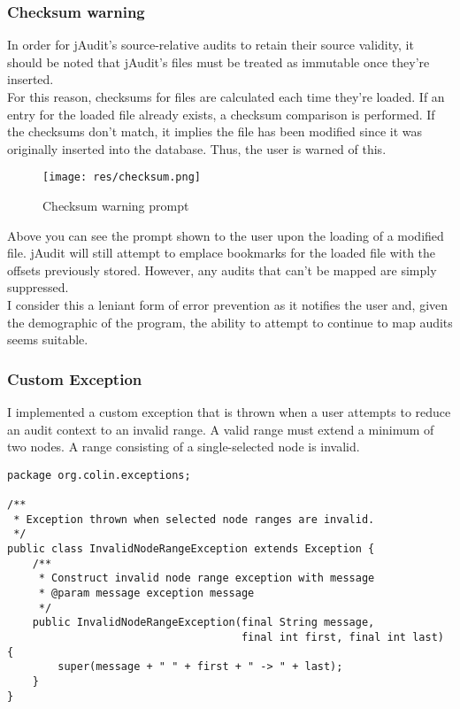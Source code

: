 \documentclass[9pt]{article}
\renewenvironment{framed}[1][\hsize]
   {\MakeFramed{\hsize#1\advance\hsize-\width \FrameRestore}}%
   {\endMakeFramed}
\begin{document}
		\subsubsection{Checksum warning}

			In order for jAudit's source-relative audits to retain their source
			validity, it should be noted that jAudit's files must be treated as
			immutable once they're inserted.\\

			For this reason, checksums for files are calculated each time
			they're loaded. If an entry for the loaded file already exists, a
			checksum comparison is performed. If the checksums don't match, it
			implies the file has been modified since it was originally inserted
			into the database. Thus, the user is warned of this.\\

			\begin{figure}[H]
				\centering
				\texttt{[image: res/checksum.png]}
				\caption{Checksum warning prompt}
			\end{figure}

			Above you can see the prompt shown to the user upon the loading of a
			modified file. jAudit will still attempt to emplace bookmarks for
			the loaded file with the offsets previously stored. However, any
			audits that can't be mapped are simply suppressed.\\

			I consider this a leniant form of error prevention as it notifies
			the user and, given the demographic of the program, the ability to
			attempt to continue to map audits seems suitable.\\

			\subsubsection{Custom Exception}

				I implemented a custom exception that is thrown when a user
				attempts to reduce an audit context to an invalid range. A valid
				range must extend a minimum of two nodes. A range consisting of
				a single-selected node is invalid.\\

				\begin{framed}[1.2\textwidth]	
					\begin{verbatim}
package org.colin.exceptions;

/**
 * Exception thrown when selected node ranges are invalid.
 */
public class InvalidNodeRangeException extends Exception {
    /**
     * Construct invalid node range exception with message
     * @param message exception message
     */
    public InvalidNodeRangeException(final String message,
	                                 final int first, final int last) {
        super(message + " " + first + " -> " + last);
    }
}
					\end{verbatim}
				\end{framed}
\end{document}

